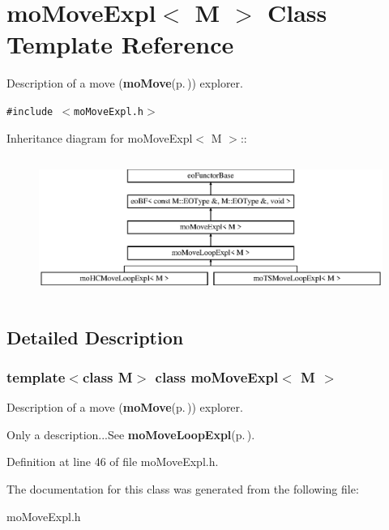 \section{mo\-Move\-Expl$<$ M $>$ Class Template Reference}
\label{classmo_move_expl}
Description of a move ({\bf mo\-Move}{\rm (p.\,\pageref{classmo_move})}) explorer.  


{\tt \#include $<$mo\-Move\-Expl.h$>$}

Inheritance diagram for mo\-Move\-Expl$<$ M $>$::\begin{figure}[H]
\begin{center}
\leavevmode
\includegraphics[height=4.59016cm]{classmo_move_expl}
\end{center}
\end{figure}


\subsection{Detailed Description}
\subsubsection*{template$<$class M$>$ class mo\-Move\-Expl$<$ M $>$}

Description of a move ({\bf mo\-Move}{\rm (p.\,\pageref{classmo_move})}) explorer. 

Only a description...See {\bf mo\-Move\-Loop\-Expl}{\rm (p.\,\pageref{classmo_move_loop_expl})}. 



Definition at line 46 of file mo\-Move\-Expl.h.

The documentation for this class was generated from the following file:\begin{CompactItemize}
\item 
mo\-Move\-Expl.h\end{CompactItemize}
